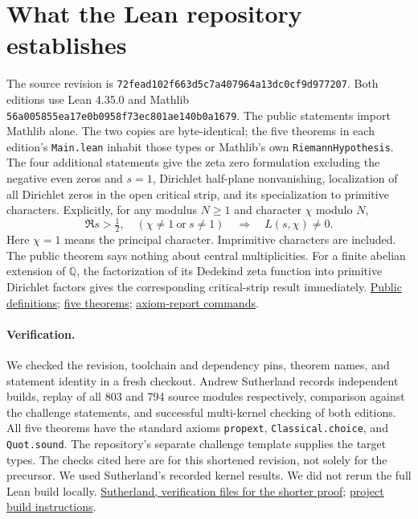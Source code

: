 \documentclass[10pt,letterpaper]{article}
\newcommand{\repo}[2]{\href{https://github.com/lsernau/grh-lean/blob/72fead102f663d5c7a407964a13dc0cf9d977207/grh/#1}{#2}}
\begin{document}
\section{What the Lean repository establishes}\label{sec:audit}
The source revision is \texttt{72fead102f663d5c7a407964a13dc0cf9d977207}.
Both editions use Lean 4.35.0 and Mathlib
\texttt{56a005855ea17e0b0958f73ec801ae140b0a1679}.
The public statements import Mathlib alone. The two copies are byte-identical;
the five theorems in each edition's \texttt{Main.lean} inhabit those types
or Mathlib's own \texttt{RiemannHypothesis}. The four additional statements
give the zeta zero formulation excluding the negative even zeros and $s=1$,
Dirichlet half-plane nonvanishing, localization of all Dirichlet zeros in
the open critical strip, and its specialization to primitive characters.
Explicitly, for any modulus $N\ge1$ and character $\chi$ modulo $N$,
\[
 \Re s>\tfrac12,\quad (\chi\ne1\ \text{or}\ s\ne1)
   \quad\Longrightarrow\quad L(s,\chi)\ne0 .
\]
Here $\chi=1$ means the principal character. Imprimitive characters are included.
The public theorem says nothing about central multiplicities. For a finite
abelian extension of $\mathbb Q$, the factorization of its Dedekind zeta
function into primitive Dirichlet factors gives the corresponding
critical-strip result immediately.
\repo{src/Statements.lean}{Public definitions};
\repo{src/Main.lean}{five theorems};
\repo{scripts/PrintAxioms.lean}{axiom-report commands}.

\paragraph{Verification.}
We checked the revision, toolchain and dependency pins, theorem names,
and statement identity in a fresh checkout.
Andrew Sutherland records independent builds, replay of all 803 and 794 source
modules respectively, comparison against the challenge statements, and successful
multi-kernel checking of both editions. All five theorems have the standard
axioms \texttt{propext}, \texttt{Classical.choice}, and \texttt{Quot.sound}.
The repository's separate challenge template supplies the target types.
The checks cited here are for this shortened revision, not solely for the precursor.
We used Sutherland's recorded kernel results. We did not rerun the full Lean
build locally. \href{https://math.mit.edu/~drew/shortgrh/}{Sutherland, verification files for the shorter proof};
\repo{README.md}{project build instructions}.
\end{document}
